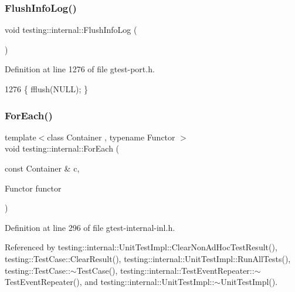 \subsubsection{\texorpdfstring{Flush\+Info\+Log()}{FlushInfoLog()}}
{\footnotesize\ttfamily void testing\+::internal\+::\+Flush\+Info\+Log (\begin{DoxyParamCaption}{ }\end{DoxyParamCaption})\hspace{0.3cm}{\ttfamily [inline]}}



Definition at line 1276 of file gtest-\/port.\+h.


\begin{DoxyCode}
1276 \{ fflush(NULL); \}
\end{DoxyCode}
\mbox{\label{namespacetesting_1_1internal_a52f5504ed65d116201ccb8f99a44fd7e}} 
\subsubsection{\texorpdfstring{For\+Each()}{ForEach()}}
{\footnotesize\ttfamily template$<$class Container , typename Functor $>$ \\
void testing\+::internal\+::\+For\+Each (\begin{DoxyParamCaption}\item[{const Container \&}]{c,  }\item[{Functor}]{functor }\end{DoxyParamCaption})}



Definition at line 296 of file gtest-\/internal-\/inl.\+h.



Referenced by testing\+::internal\+::\+Unit\+Test\+Impl\+::\+Clear\+Non\+Ad\+Hoc\+Test\+Result(), testing\+::\+Test\+Case\+::\+Clear\+Result(), testing\+::internal\+::\+Unit\+Test\+Impl\+::\+Run\+All\+Tests(), testing\+::\+Test\+Case\+::$\sim$\+Test\+Case(), testing\+::internal\+::\+Test\+Event\+Repeater\+::$\sim$\+Test\+Event\+Repeater(), and testing\+::internal\+::\+Unit\+Test\+Impl\+::$\sim$\+Unit\+Test\+Impl().


